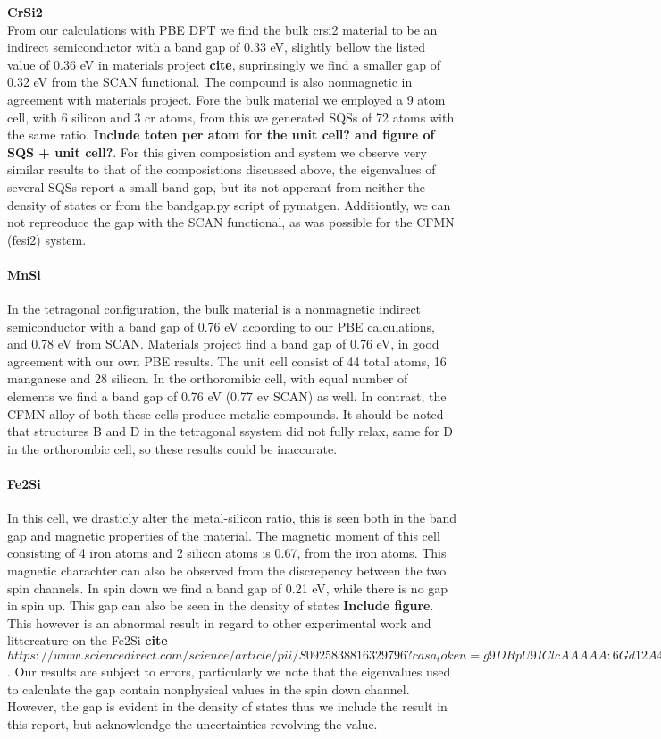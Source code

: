 \textbf{CrSi2 \\}
From our calculations with PBE DFT we find the bulk crsi2 material to be an indirect semiconductor with a band gap of 0.33 eV, slightly bellow the listed value of 0.36 eV in materials project \textbf{cite}, suprinsingly we find a smaller gap of 0.32 eV from the SCAN functional. The compound is also nonmagnetic in agreement with materials project. Fore the bulk material we employed a 9 atom cell, with 6 silicon and 3 cr atoms, from this we generated SQSs of 72 atoms with the same ratio.  \textbf{Include toten per atom for the unit cell? and figure of SQS + unit cell?}. For this given composistion and system we observe very similar results to that of the composistions discussed above, the eigenvalues of several SQSs report a small band gap, but its not apperant from neither the density of states or from the bandgap.py script of pymatgen. Additiontly, we can not repreoduce the gap with the SCAN functional, as was possible for the CFMN (fesi2) system.   

\paragraph{MnSi \\}
In the tetragonal configuration, the bulk material is a nonmagnetic indirect semiconductor with a band gap of 0.76 eV acoording to our PBE calculations,  and 0.78 eV from SCAN. Materials project find a band gap of 0.76 eV, in good agreement with our own PBE results. The unit cell consist of 44 total atoms, 16 manganese and 28 silicon. In the orthoromibic cell, with equal number of elements we find a band gap of 0.76 eV (0.77 ev SCAN) as well. In contrast, the CFMN alloy of both these cells produce metalic compounds. It should be noted that structures B and D in the tetragonal ssystem did not fully relax, same for D in the orthorombic cell, so these results could be inaccurate.   

\paragraph{Fe2Si \\}
In this cell, we drasticly alter the metal-silicon ratio, this is seen both in the band gap and magnetic properties of the material. The magnetic moment of this cell consisting of 4 iron atoms and 2 silicon atoms is 0.67, from the iron atoms. This magnetic charachter can also be observed from the discrepency between the two spin channels. In spin down we find a band gap of 0.21 eV, while there is no gap in spin up. This gap can also be seen in the density of states \textbf{Include figure}. This however is an abnormal result in regard to other experimental work and littereature on the Fe2Si \textbf{cite $https://www.sciencedirect.com/science/article/pii/S0925838816329796?casa_token=g9DRpU9IClcAAAAA:6Gd12A4Kh9J2igUWMVwHN8OSIKzD27VACA052FNsSAWhRY6PELWdVEPbiF8OtQ3eJEAbvQ8X0g$}. Our results are subject to errors, particularly we note that the eigenvalues used to calculate the gap contain nonphysical values in the spin down channel. However, the gap is evident in the density of states thus we include the result in this report, but acknowlendge the uncertainties revolving the value. 

